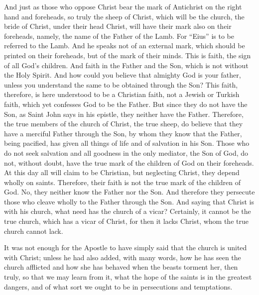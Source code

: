 And just as those who oppose Christ bear the mark of Antichrist on the right hand and foreheads, so truly the sheep of Christ, which will be the church, the bride of Christ, under their head Christ, will have their mark also on their foreheads, namely, the name of the Father of the Lamb. For “Eius” is to be referred to the Lamb. And he speaks not of an external mark, which should be printed on their foreheads, but of the mark of their minds. This is faith, the sign of all God’s children. And faith in the Father and the Son, which is not without the Holy Spirit. And how could you believe that almighty God is your father, unless you understand the same to be obtained through the Son? This faith, therefore, is here understood to be a Christian faith, not a Jewish or Turkish faith, which yet confesses God to be the Father. But since they do not have the Son, as Saint John says in his epistle, they neither have the Father. Therefore, the true members of the church of Christ, the true sheep, do believe that they have a merciful Father through the Son, by whom they know that the Father, being pacified, has given all things of life and of salvation in his Son. Those who do not seek salvation and all goodness in the only mediator, the Son of God, do not, without doubt, have the true mark of the children of God on their foreheads. At this day all will claim to be Christian, but neglecting Christ, they depend wholly on saints. Therefore, their faith is not the true mark of the children of God. No, they neither know the Father nor the Son. And therefore they persecute those who cleave wholly to the Father through the Son. And saying that Christ is with his church, what need has the church of a vicar? Certainly, it cannot be the true church, which has a vicar of Christ, for then it lacks Christ, whom the true church cannot lack.

It was not enough for the Apostle to have simply said that the church is united with Christ; unless he had also added, with many words, how he has seen the church afflicted and how she has behaved when the beasts torment her, then truly, so that we may learn from it, what the hope of the saints is in the greatest dangers, and of what sort we ought to be in persecutions and temptations.

